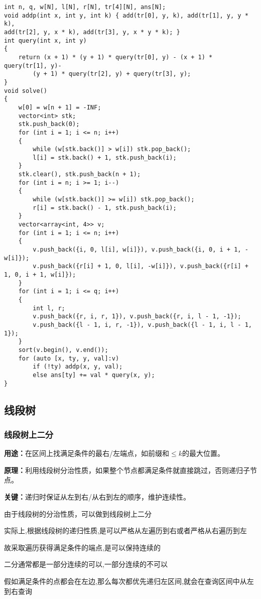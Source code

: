 \documentclass[a4paper, fontset=none]{ctexart}
\begin{document}
\begin{verbatim}
int n, q, w[N], l[N], r[N], tr[4][N], ans[N];
void addp(int x, int y, int k) { add(tr[0], y, k), add(tr[1], y, y * k),
add(tr[2], y, x * k), add(tr[3], y, x * y * k); }
int query(int x, int y)
{
    return (x + 1) * (y + 1) * query(tr[0], y) - (x + 1) * query(tr[1], y)-
        (y + 1) * query(tr[2], y) + query(tr[3], y);
}
void solve()
{
    w[0] = w[n + 1] = -INF;
    vector<int> stk;
    stk.push_back(0);
    for (int i = 1; i <= n; i++)
    {
        while (w[stk.back()] > w[i]) stk.pop_back();
        l[i] = stk.back() + 1, stk.push_back(i);
    }
    stk.clear(), stk.push_back(n + 1);
    for (int i = n; i >= 1; i--)
    {
        while (w[stk.back()] >= w[i]) stk.pop_back();
        r[i] = stk.back() - 1, stk.push_back(i);
    }
    vector<array<int, 4>> v;
    for (int i = 1; i <= n; i++)
    {
        v.push_back({i, 0, l[i], w[i]}), v.push_back({i, 0, i + 1, -w[i]});
        v.push_back({r[i] + 1, 0, l[i], -w[i]}), v.push_back({r[i] + 1, 0, i + 1, w[i]});
    }
    for (int i = 1; i <= q; i++)
    {
        int l, r;
        v.push_back({r, i, r, 1}), v.push_back({r, i, l - 1, -1});
        v.push_back({l - 1, i, r, -1}), v.push_back({l - 1, i, l - 1, 1});
    }
    sort(v.begin(), v.end());
    for (auto [x, ty, y, val]:v)
        if (!ty) addp(x, y, val);
        else ans[ty] += val * query(x, y);
}
\end{verbatim}
\subsection{线段树}
\subsubsection{线段树上二分}
\textbf{用途：}在区间上找满足条件的最右/左端点，如前缀和$\leq k$的最大位置。

\textbf{原理：}利用线段树分治性质，如果整个节点都满足条件就直接跳过，否则递归子节点。

\textbf{关键：}递归时保证从左到右/从右到左的顺序，维护连续性。

由于线段树的分治性质，可以做到线段树上二分

实际上,根据线段树的递归性质,是可以严格从左遍历到右或者严格从右遍历到左

故采取遍历获得满足条件的端点,是可以保持连续的

二分通常都是一部分连续的可以,一部分连续的不可以

假如满足条件的点都会在左边,那么每次都优先递归左区间,就会在查询区间中从左到右查询
\end{document}
